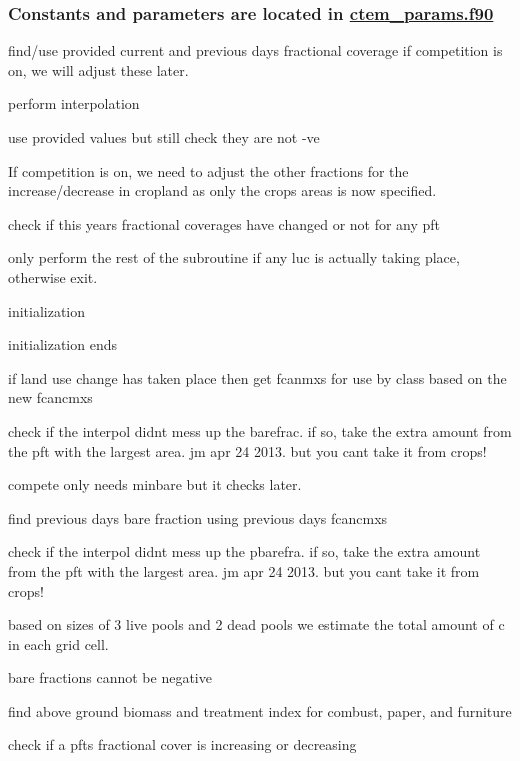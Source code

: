  \subsubsection*{Constants and parameters are located in \hyperlink{ctem__params_8f90}{ctem\+\_\+params.\+f90} }





find/use provided current and previous day\textquotesingle{}s fractional coverage if competition is on, we will adjust these later.

perform interpolation

use provided values but still check they are not -\/ve

If competition is on, we need to adjust the other fractions for the increase/decrease in cropland as only the crops areas is now specified.

check if this year\textquotesingle{}s fractional coverages have changed or not for any pft

only perform the rest of the subroutine if any luc is actually taking place, otherwise exit. 

 initialization

initialization ends 



if land use change has taken place then get fcanmxs for use by class based on the new fcancmxs

check if the interpol didn\textquotesingle{}t mess up the barefrac. if so, take the extra amount from the pft with the largest area. jm apr 24 2013. but you can\textquotesingle{}t take it from crops!

compete only needs minbare but it checks later.

find previous day\textquotesingle{}s bare fraction using previous day\textquotesingle{}s fcancmxs

check if the interpol didn\textquotesingle{}t mess up the pbarefra. if so, take the extra amount from the pft with the largest area. jm apr 24 2013. but you can\textquotesingle{}t take it from crops!

based on sizes of 3 live pools and 2 dead pools we estimate the total amount of c in each grid cell.

bare fractions cannot be negative

find above ground biomass and treatment index for combust, paper, and furniture

check if a pft\textquotesingle{}s fractional cover is increasing or decreasing

